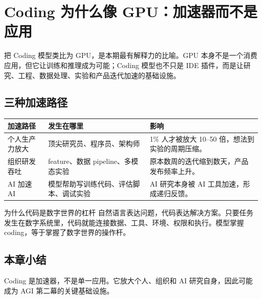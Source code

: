 \section{Coding 为什么像 GPU：加速器而不是应用}

把 Coding 模型类比为 GPU，是本期最有解释力的比喻。GPU 本身不是一个消费应用，但它让训练和推理成为可能；Coding 模型也不只是 IDE 插件，而是让研究、工程、数据处理、实验和产品迭代加速的基础设施。

\subsection{三种加速路径}

\noindent\begin{tabularx}{\textwidth}{p{}p{}X}
\toprule
加速路径 & 发生在哪里 & 影响 \\
\midrule
个人生产力放大 & 顶尖研究员、程序员、架构师 & 1\% 人才被放大 10--50 倍，想法到实验的周期压缩。 \\
组织研发吞吐 & feature、数据 pipeline、多模态实验 & 原本数周的迭代缩到数天，产品发布频率上升。 \\
AI 加速 AI & 模型帮助写训练代码、评估脚本、调试实验 & AI 研究本身被 AI 工具加速，形成递归反馈。 \\
\bottomrule
\end{tabularx}

\begin{knowledgebox}{为什么代码是数字世界的杠杆}
自然语言表达问题，代码表达解决方案。只要任务发生在数字系统里，代码就能连接数据、工具、环境、权限和执行。模型掌握 coding，等于掌握了数字世界的操作杆。
\end{knowledgebox}

\subsection{本章小结}

Coding 是加速器，不是单一应用。它放大个人、组织和 AI 研究自身，因此可能成为 AGI 第二幕的关键基础设施。

